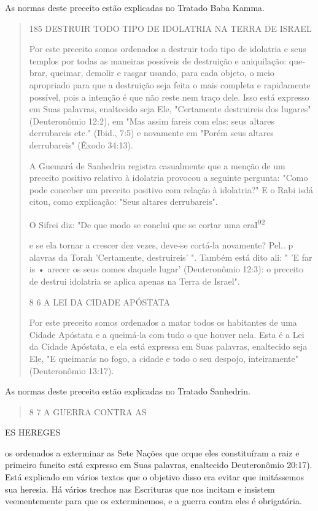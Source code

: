 As normas deste preceito estão explicadas no Tratado Baba Kamma.

\begin{quote}
185 DESTRUIR TODO TIPO DE IDOLATRIA NA TERRA DE ISRAEL

Por este preceito somos ordenados a destruir todo tipo de idolatria e
seus templos por todas as maneiras possíveis de destruição e
aniquilação: que­brar, queimar, demolir e rasgar usando, para cada
objeto, o meio apropriado para que a destruição seja feita o mais
completa e rapidamente possível, pois a intenção é que não reste nem
traço dele. Isso está expresso em Suas palavras, enaltecido seja Ele,
"Certamente destruireis dos lugares" (Deuteronômio 12:2), em "Mas assim
fareis com elas: seus altares derrubareis etc." (Ibid., 7:5) e
nova­mente em "Porém seus altares derrubareis" (Êxodo 34:13).

A Guemará de Sanhedrin registra casualmente que a menção de um preceito
positivo relativo à idolatria provocou a seguinte pergunta: "Como pode
conceber um preceito positivo com relação à idolatria?" E o Rabi isdá
citou, como explicação: "Seus altares derrubareis".

O Sifrei diz: "De que modo se conclui que se cortar uma
eraI\textsuperscript{92}

e se ela tornar a crescer dez vezes, deve-se cortá-la novamente? Pel.. p
alavras da Torah 'Certamente, destruireis' ". Também está dito ali: " 'E
far is • arecer os seus nomes daquele lugar' (Deuteronômio 12:3): o
preceito de destrui ido­latria se aplica apenas na Terra de Israel".

8 6 A LEI DA CIDADE APÓSTATA

Por este preceito somos ordenados a matar todos os habitantes de uma
Cidade Apóstata e a queimá-la com tudo o que houver nela. Esta é a Lei
da Cidade Apóstata, e ela está expressa em Suas palavras, enaltecido
seja Ele, "E queimarás no fogo, a cidade e todo o seu despojo,
inteiramente" (Deuteronômio 13:17).
\end{quote}

As normas deste preceito estão explicadas no Tratado Sanhedrin.

\begin{quote}
8 7 A GUERRA CONTRA AS
\end{quote}

ES HEREGES

os ordenados a exterminar as Sete Nações que orque eles constituíram a
raiz e primeiro fun­eito está expresso em Suas palavras, enaltecido
Deuteronômio 20:17). Está explicado em vários textos que o objetivo
disso era evitar que imitássemos sua heresia. Há vários trechos nas
Escrituras que nos incitam e insistem veementemente para que os
exterminemos, e a guerra contra eles é obrigatória.

